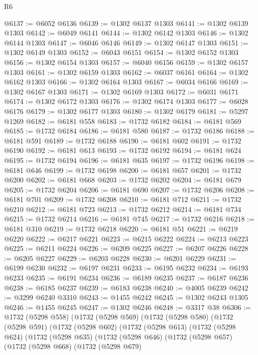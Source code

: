 \begin{lexlean}{R6}
\begin{coremodule}
@6137 := @6052 @6136
@6139 := @1302 @6137 @1303
@6141 := @1302 @6139 @1303
@6142 := @6049 @6141
@6144 := @1302 @6142 @1303
@6146 := @1302 @6144 @1303
@6147 := @6046 @6146
@6149 := @1302 @6147 @1303
@6151 := @1302 @6149 @1303
@6152 := @6043 @6151
@6154 := @1302 @6152 @1303
@6156 := @1302 @6154 @1303
@6157 := @6040 @6156
@6159 := @1302 @6157 @1303
@6161 := @1302 @6159 @1303
@6162 := @6037 @6161
@6164 := @1302 @6162 @1303
@6166 := @1302 @6164 @1303
@6167 := @6034 @6166
@6169 := @1302 @6167 @1303
@6171 := @1302 @6169 @1303
@6172 := @6031 @6171
@6174 := @1302 @6172 @1303
@6176 := @1302 @6174 @1303
@6177 := @6028 @6176
@6179 := @1302 @6177 @1303
@6180 := @1302 @6179
@6181 := @5297 @1269
@6182 := @6181 @558
@6183 := @1732 @6182
@6184 := @6181 @569
@6185 := @1732 @6184
@6186 := @6181 @580
@6187 := @1732 @6186
@6188 := @6181 @591
@6189 := @1732 @6188
@6190 := @6181 @602
@6191 := @1732 @6190
@6192 := @6181 @613
@6193 := @1732 @6192
@6194 := @6181 @624
@6195 := @1732 @6194
@6196 := @6181 @635
@6197 := @1732 @6196
@6198 := @6181 @646
@6199 := @1732 @6198
@6200 := @6181 @657
@6201 := @1732 @6200
@6202 := @6181 @668
@6203 := @1732 @6202
@6204 := @6181 @679
@6205 := @1732 @6204
@6206 := @6181 @690
@6207 := @1732 @6206
@6208 := @6181 @701
@6209 := @1732 @6208
@6210 := @6181 @712
@6211 := @1732 @6210
@6212 := @6181 @723
@6213 := @1732 @6212
@6214 := @6181 @734
@6215 := @1732 @6214
@6216 := @6181 @745
@6217 := @1732 @6216
@6218 := @6181 @310
@6219 := @1732 @6218
@6220 := @6181 @51
@6221 := @6219 @6220
@6222 := @6217 @6221
@6223 := @6215 @6222
@6224 := @6213 @6223
@6225 := @6211 @6224
@6226 := @6209 @6225
@6227 := @6207 @6226
@6228 := @6205 @6227
@6229 := @6203 @6228
@6230 := @6201 @6229
@6231 := @6199 @6230
@6232 := @6197 @6231
@6233 := @6195 @6232
@6234 := @6193 @6233
@6235 := @6191 @6234
@6236 := @6189 @6235
@6237 := @6187 @6236
@6238 := @6185 @6237
@6239 := @6183 @6238
@6240 := @4005 @6239
@6242 := @3299 @6240 @3310
@6243 := @1455 @6242
@6245 := @1302 @6243 @1305
@6246 := @1455 @6245
@6247 := @1302 @6246
@6248 := @3317 @38
@6306 := @1732
    (@5298 @558)
    (@1732
      (@5298 @569)
      (@1732
        (@5298 @580)
        (@1732
          (@5298 @591)
          (@1732
            (@5298 @602)
            (@1732
              (@5298 @613)
              (@1732
                (@5298 @624)
                (@1732
                  (@5298 @635)
                  (@1732
                    (@5298 @646)
                    (@1732
                      (@5298 @657)
                      (@1732
                        (@5298 @668)
                        (@1732
                          (@5298 @679)

\end{coremodule}
\end{lexlean}

